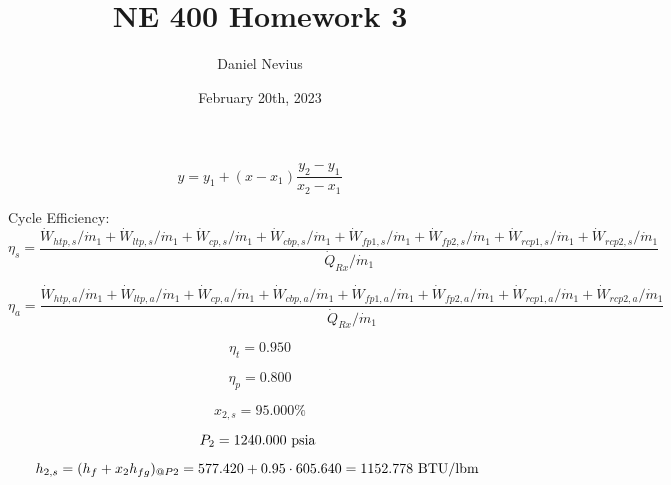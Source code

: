 \documentclass{article}
\title{NE 400 Homework 3}
\author{Daniel Nevius}
\date{February 20th, 2023}
\begin{document}
\maketitle

\section{}

\begin{equation}\label{interpolation}
y = y_1 + (x - x_1) \frac{y_2 - y_1}{x_2 - x_1}
\end{equation}


Cycle Efficiency:
\begin{equation}
\eta    _{s} = \frac{\dot{W}_{htp    ,s} / \dot{m}_{1} + \dot{W}_{ltp    ,s} / \dot{m}_{1} + \dot{W}_{cp     ,s} / \dot{m}_{1} + \dot{W}_{cbp    ,s} / \dot{m}_{1} + \dot{W}_{fp1    ,s} / \dot{m}_{1} + \dot{W}_{fp2    ,s} / \dot{m}_{1} + \dot{W}_{rcp1   ,s} / \dot{m}_{1} + \dot{W}_{rcp2   ,s} / \dot{m}_{1}}{\dot{Q}_{Rx     } / \dot{m}_{1}}
\end{equation}

\begin{equation}
\eta    _{a} = \frac{\dot{W}_{htp    ,a} / \dot{m}_{1} + \dot{W}_{ltp    ,a} / \dot{m}_{1} + \dot{W}_{cp     ,a} / \dot{m}_{1} + \dot{W}_{cbp    ,a} / \dot{m}_{1} + \dot{W}_{fp1    ,a} / \dot{m}_{1} + \dot{W}_{fp2    ,a} / \dot{m}_{1} + \dot{W}_{rcp1   ,a} / \dot{m}_{1} + \dot{W}_{rcp2   ,a} / \dot{m}_{1}}{\dot{Q}_{Rx     } / \dot{m}_{1}}
\end{equation}

\begin{equation}
\eta_{t} =    0.950
\end{equation}

\begin{equation}
\eta_{p} =    0.800
\end{equation}

\begin{equation}
x_{ 2,s} =   95.000\%
\end{equation}

\begin{equation}
P_{ 2} = 1240.000\textnormal{ psia                      }
\end{equation}

\begin{equation}
  h_{ 2,s} = (h_{f} + x_{ 2}h_{fg})_{@P 2} =  577.420 + 0.95\cdot 605.640 = 1152.778
\textnormal{ BTU/lbm                   }
\end{equation}
\end{document}
